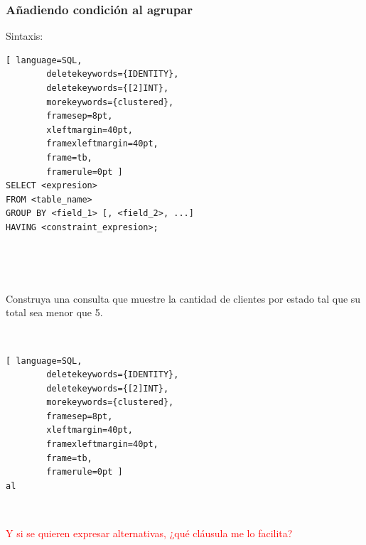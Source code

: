 \documentclass[
	10pt, %
	aspectratio=169, %
]{beamer}
\begin{document}
\begin{frame}[fragile]

	\frametitle{Añadiendo condición al agrupar}

	Sintaxis:
	\begin{lstlisting}[ language=SQL,
		deletekeywords={IDENTITY},
		deletekeywords={[2]INT},
		morekeywords={clustered},
		framesep=8pt,
		xleftmargin=40pt,
		framexleftmargin=40pt,
		frame=tb,
		framerule=0pt ]
SELECT <expresion>
FROM <table_name>
GROUP BY <field_1> [, <field_2>, ...]
HAVING <constraint_expresion>;
\end{lstlisting}

	\pause 

	\ 

	\  

	Construya una consulta que muestre la cantidad de clientes por estado tal que su total sea menor que 5. 

	\  

	\pause 

	\begin{lstlisting}[ language=SQL,
		deletekeywords={IDENTITY},
		deletekeywords={[2]INT},
		morekeywords={clustered},
		framesep=8pt,
		xleftmargin=40pt,
		framexleftmargin=40pt,
		frame=tb,
		framerule=0pt ]
al
\end{lstlisting}

	\pause
	
	\ 
	
	\textcolor{red}{Y si se quieren expresar alternativas, ¿qué cláusula me lo facilita?}

\end{frame}

\end{document}
